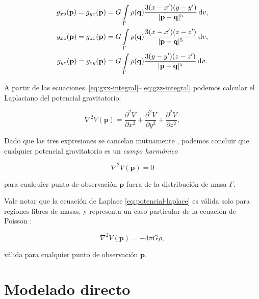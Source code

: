 \begin{align}
    g_{xy}(\mathbf{p}) =
    g_{yx}(\mathbf{p}) &=
        G \int\limits_\Gamma \rho(\mathbf{q})
        \frac{3(x - x')(y - y')}{|\mathbf{p} - \mathbf{q}|^5}
        \mathop{}\!\textnormal{d} v,
    \label{eq:gxy-integral}
    \\
    g_{xz}(\mathbf{p}) =
    g_{zx}(\mathbf{p}) &=
        G \int\limits_\Gamma \rho(\mathbf{q})
        \frac{3(x - x')(z - z')}{|\mathbf{p} - \mathbf{q}|^5}
        \mathop{}\!\textnormal{d} v,
    \label{eq:gxz-integral}
    \\
    g_{yz}(\mathbf{p}) =
    g_{zy}(\mathbf{p}) &=
        G \int\limits_\Gamma \rho(\mathbf{q})
        \frac{3(y - y')(z - z')}{|\mathbf{p} - \mathbf{q}|^5}
        \mathop{}\!\textnormal{d} v.
    \label{eq:gyz-integral}
\end{align}

A partir de las ecuaciones~\ref{eq:gxx-integral}--\ref{eq:gzz-integral} podemos
calcular el Laplaciano del potencial gravitatorio:

\begin{equation}
    \nabla^2 V(\mathbf{p}) =
        \frac{\partial^2 V}{\partial x^2}
        + \frac{\partial^2 V}{\partial y^2}
        + \frac{\partial^2 V}{\partial z^2},
\end{equation}

\noindent Dado que las tres expresiones se cancelan mutuamente
\citep{blakely1995}, podemos concluir que cualquier potencial gravitatorio es
un \emph{campo harmónico}

\begin{equation}
    \nabla^2 V(\mathbf{p}) = 0
    \label{eq:potencial-laplace}
\end{equation}

\noindent para cualquier punto de observación $\mathbf{p}$ fuera de la
distribución de masa $\Gamma$.

Vale notar que la ecuación de Laplace \ref{eq:potencial-laplace} es válida
solo para regiones libres de masas, y representa un caso particular de la
ecuación de Poisson \citep{blakely1995}:

\begin{equation}
    \nabla^2 V(\mathbf{p}) = -4\pi G \rho,
    \label{eq:potencial-poisson}
\end{equation}

\noindent válida para cualquier punto de observación $\mathbf{p}$.


\section{Modelado directo}

